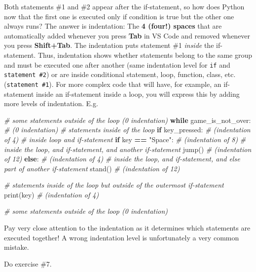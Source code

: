 \documentclass[
]{book}
\newenvironment{Shaded}{\begin{snugshade}}{\end{snugshade}}
\newcommand{\BuiltInTok}[1]{#1}
\newcommand{\CommentTok}[1]{\textcolor[rgb]{0.56,0.35,0.01}{\textit{#1}}}
\newcommand{\ControlFlowTok}[1]{\textcolor[rgb]{0.13,0.29,0.53}{\textbf{#1}}}
\newcommand{\NormalTok}[1]{#1}
\newcommand{\OperatorTok}[1]{\textcolor[rgb]{0.81,0.36,0.00}{\textbf{#1}}}
\newcommand{\StringTok}[1]{\textcolor[rgb]{0.31,0.60,0.02}{#1}}
\begin{document}
Both statements \#1 and \#2 appear after the if-statement, so how does Python now that the first one is executed only if condition is true but the other one always runs? The answer is indentation: The \textbf{4 (four!) spaces} that are automatically added whenever you press \textbf{Tab} in VS Code and removed whenever you press \textbf{Shift+Tab}. The indentation puts statement \#1 \emph{inside} the if-statement. Thus, indentation shows whether statements belong to the same group and must be executed one after another (same indentation level for \texttt{if} and \texttt{statement\ \#2}) or are inside conditional statement, loop, function, class, etc. (\texttt{statement\ \#1}). For more complex code that will have, for example, an if-statement inside an if-statement inside a loop, you will express this by adding more levels of indentation. E.g.

\begin{Shaded}
\begin{Highlighting}[]
\CommentTok{\# some statements outside of the loop (0 indentation)}
\ControlFlowTok{while}\NormalTok{ game\_is\_not\_over: }\CommentTok{\# (0 indentation)}
    \CommentTok{\# statements inside of the loop }
    \ControlFlowTok{if}\NormalTok{ key\_pressed: }\CommentTok{\# (indentation of 4)}
        \CommentTok{\# inside loop and if{-}statement }
        \ControlFlowTok{if}\NormalTok{ key }\OperatorTok{==} \StringTok{"Space"}\NormalTok{: }\CommentTok{\# (indentation of 8)}
            \CommentTok{\# inside the loop, and if{-}statement, and another if{-}statement}
\NormalTok{            jump() }\CommentTok{\# (indentation of 12)}
        \ControlFlowTok{else}\NormalTok{: }\CommentTok{\# (indentation of 4)}
            \CommentTok{\# inside the loop, and if{-}statement, and else part of another if{-}statement}
\NormalTok{            stand() }\CommentTok{\# (indentation of 12)}
    
    \CommentTok{\# statements inside of the loop but outside of the outermost if{-}statement}
    \BuiltInTok{print}\NormalTok{(key) }\CommentTok{\# (indentation of 4)}
    
\CommentTok{\# some statements outside of the loop (0 indentation)}
\end{Highlighting}
\end{Shaded}

Pay very close attention to the indentation as it determines which statements are executed together! A wrong indentation level is unfortunately a very common mistake.

Do exercise \#7.
\end{document}
